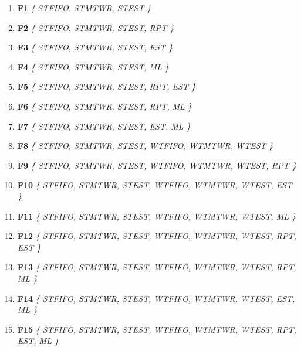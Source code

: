 \documentclass[runningheads]{llncs}
\begin{document}
\begin{enumerate}
\item \textbf{F1} \textrightarrow \textit{\{ ST\textunderscore FIFO, ST\textunderscore MTWR, ST\textunderscore EST \}}
\item \textbf{F2} \textrightarrow \textit{\{ ST\textunderscore FIFO, ST\textunderscore MTWR, ST\textunderscore EST, RPT \}} 
\item \textbf{F3} \textrightarrow \textit{\{ ST\textunderscore FIFO, ST\textunderscore MTWR, ST\textunderscore EST, EST \}} 
\item \textbf{F4} \textrightarrow \textit{\{ ST\textunderscore FIFO, ST\textunderscore MTWR, ST\textunderscore EST, ML \}} 
\item \textbf{F5} \textrightarrow \textit{\{ ST\textunderscore FIFO, ST\textunderscore MTWR, ST\textunderscore EST, RPT, EST \}}
\item \textbf{F6} \textrightarrow \textit{\{ ST\textunderscore FIFO, ST\textunderscore MTWR, ST\textunderscore EST, RPT, ML \}} 
\item \textbf{F7} \textrightarrow \textit{\{ ST\textunderscore FIFO, ST\textunderscore MTWR, ST\textunderscore EST, EST, ML \}} 
\item \textbf{F8} \textrightarrow \textit{\{ ST\textunderscore FIFO, ST\textunderscore MTWR, ST\textunderscore EST, WT\textunderscore FIFO, WT\textunderscore MTWR, WT\textunderscore EST \}} 
\item \textbf{F9} \textrightarrow \textit{\{ ST\textunderscore FIFO, ST\textunderscore MTWR, ST\textunderscore EST, WT\textunderscore FIFO, WT\textunderscore MTWR, WT\textunderscore EST, RPT \}} 
\item \textbf{F10} \textrightarrow \textit{\{ ST\textunderscore FIFO, ST\textunderscore MTWR, ST\textunderscore EST, WT\textunderscore FIFO, WT\textunderscore MTWR, WT\textunderscore EST, EST \}} 
\item \textbf{F11} \textrightarrow \textit{\{ ST\textunderscore FIFO, ST\textunderscore MTWR, ST\textunderscore EST, WT\textunderscore FIFO, WT\textunderscore MTWR, WT\textunderscore EST, ML \}}
\item \textbf{F12} \textrightarrow \textit{\{ ST\textunderscore FIFO, ST\textunderscore MTWR, ST\textunderscore EST, WT\textunderscore FIFO, WT\textunderscore MTWR, WT\textunderscore EST, RPT, EST \}}
\item \textbf{F13} \textrightarrow \textit{\{ ST\textunderscore FIFO, ST\textunderscore MTWR, ST\textunderscore EST, WT\textunderscore FIFO, WT\textunderscore MTWR, WT\textunderscore EST, RPT, ML \}}
\item \textbf{F14} \textrightarrow \textit{\{ ST\textunderscore FIFO, ST\textunderscore MTWR, ST\textunderscore EST, WT\textunderscore FIFO, WT\textunderscore MTWR, WT\textunderscore EST, EST, ML \}}
\item \textbf{F15} \textrightarrow \textit{\{ ST\textunderscore FIFO, ST\textunderscore MTWR, ST\textunderscore EST, WT\textunderscore FIFO, WT\textunderscore MTWR, WT\textunderscore EST, RPT, EST, ML \}}
\end{enumerate}
\end{document}
